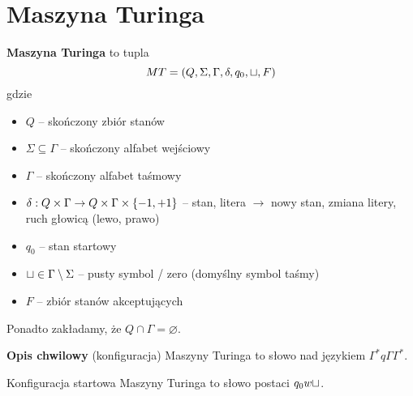 \section{Maszyna Turinga}

\begin{definition}

	\textbf{Maszyna Turinga} to tupla
	\[
		MT = (Q, \Sigma, \Gamma, \delta, q_0, \sqcup, F)
	\]
	gdzie
	\begin{itemize}
		\item \( Q \) -- skończony zbiór stanów
		\item \( \Sigma \subseteq \Gamma \) -- skończony alfabet wejściowy
		\item \( \Gamma \) -- skończony alfabet taśmowy
		\item \( \delta : Q \times \Gamma \rightarrow
		      Q \times \Gamma \times \set{-1, +1}
		      \) -- stan, litera \( \rightarrow \) nowy stan, zmiana litery, ruch głowicą (lewo, prawo)
		\item \( q_0 \) -- stan startowy
		\item \( \sqcup \in \Gamma \setminus \Sigma \) -- pusty symbol / zero (domyślny symbol taśmy)
		\item \( F \) -- zbiór stanów akceptujących
	\end{itemize}

	Ponadto zakładamy, że \(Q \cap \Gamma = \varnothing\).
\end{definition}

\begin{definition}
	\textbf{Opis chwilowy} (konfiguracja) Maszyny Turinga to słowo nad językiem \(\Gamma^* q\Gamma \Gamma^* \).
\end{definition}

\begin{definition}
	Konfiguracja startowa Maszyny Turinga to słowo postaci \(q_0w\sqcup\).
\end{definition}

